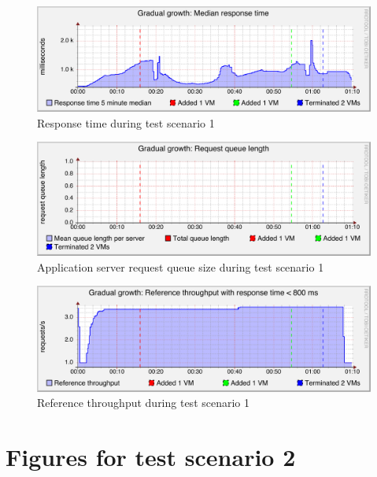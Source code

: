 \documentclass[english]{tktltiki2}
\theoremstyle{definition}
\theoremstyle{remark}
\begin{document}
\begin{figure}[htbp]
	\includegraphics[width=\textwidth]{images/responsetimegraph-test21}
	\caption{Response time during test scenario 1}
	\label{fig:responseTimeScenario1}
\end{figure}

\begin{figure}[htbp]
	\includegraphics[width=\textwidth]{images/queuesizegraph-test21}
	\caption{Application server request queue size during test scenario 1}
	\label{fig:queueScenario1}
\end{figure}

\begin{figure}[htbp]
	\includegraphics[width=\textwidth]{images/referencethroughputgraph-test21}
	\caption{Reference throughput during test scenario 1}
	\label{fig:referenceThroughputScenario1}
\end{figure}

\clearpage

\section{Figures for test scenario 2}
\end{document}
